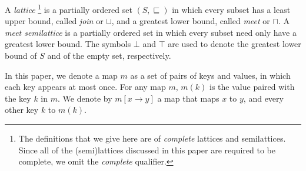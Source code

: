 A \textit{lattice}%
\footnote{The definitions that we give here are of \textit{complete} lattices and semilattices.
Since all of the (semi)lattices discussed in this paper are required to be complete, we omit the
\textit{complete} qualifier.}
is a partially ordered set $(S,\sqsubseteq)$ in which every subset has a least upper bound, called \textit{join} or $\sqcup$, and a greatest lower bound, called \textit{meet} or $\sqcap$.
A \textit{meet semilattice} is a partially ordered set in which every subset need only have a greatest lower bound.
The symbols $\bot$ and $\top$ are used to denote the greatest lower bound of $S$ and of the empty set, respectively.



In this paper, we denote a map $m$ as a set of pairs of keys and values, in which each key appears at most once.
For any map $m$,  $m(k)$ is the value paired with the key $k$ in $m$. We denote by $m[x\to y]$ a map that maps $x$ to $y$, and every other key $k$ to $m(k)$.




